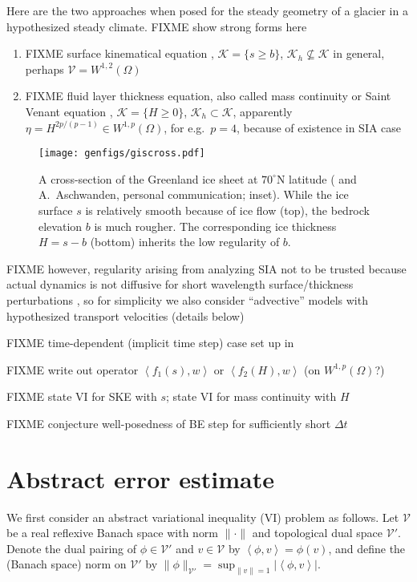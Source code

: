 \documentclass[hidelinks,onefignum,onetabnum,final]{siamart220329}  %
\newcommand{\cK}{\mathcal{K}}
\newcommand{\cV}{\mathcal{V}}
\newcommand{\ip}[2]{\left<#1,#2\right>}
\begin{document}
Here are the two approaches when posed for the steady geometry of a glacier in a hypothesized steady climate.  FIXME show strong forms here

\begin{enumerate}
\item FIXME surface kinematical equation \cite{GreveBlatter2009}, $\cK = \{s\ge b\}$, $\cK_h \nsubseteq \cK$ in general, perhaps $\cV = W^{1,2}(\Omega)$
\item FIXME fluid layer thickness equation, also called mass continuity or Saint Venant equation \cite{JouvetBueler2012}, $\cK = \{H\ge 0\}$, $\cK_h \subset \cK$, apparently $\eta = H^{2p/(p-1)} \in W^{1,p}(\Omega)$, for e.g.~$p=4$, because of existence in SIA case \cite{JouvetBueler2012}
\end{enumerate}

\begin{figure}[ht]
\centering
\texttt{[image: genfigs/giscross.pdf]}
\caption{A cross-section of the Greenland ice sheet at $70^\circ$N latitude (\cite{Morlighemetal2017} and A.~Aschwanden, personal communication; inset).  While the ice surface $s$ is relatively smooth because of ice flow (top), the bedrock elevation $b$ is much rougher.  The corresponding ice thickness $H = s-b$ (bottom) inherits the low regularity of $b$.}
\label{fig:giscross}
\end{figure}

FIXME however, regularity arising from analyzing SIA not to be trusted because actual dynamics is not diffusive for short wavelength surface/thickness perturbations \cite{Pattynetal2008}, so for simplicity we also consider ``advective'' models with hypothesized transport velocities (details below)

FIXME time-dependent (implicit time step) case set up in \cite{Bueler2021conservation}

FIXME write out operator $\ip{f_1(s)}{w}$ or $\ip{f_2(H)}{w}$  (on $W^{1,p}(\Omega)$?)

FIXME state VI for SKE with $s$; state VI for mass continuity with $H$

FIXME conjecture well-posedness of BE step for sufficiently short $\Delta t$


\section{Abstract error estimate} \label{sec:abstractestimate}

We first consider an abstract variational inequality (VI) \cite{KinderlehrerStampacchia1980} problem as follows.  Let $\cV$ be a real reflexive Banach space with norm $\|\cdot\|$ and topological dual space $\cV'$.  Denote the dual pairing of $\phi \in \cV'$ and $v\in\cV$ by $\ip{\phi}{v} = \phi(v)$, and define the (Banach space) norm on $\cV'$ by $\|\phi\|_{\cV'} = \sup_{\|v\|=1} |\!\ip{\phi}{v}\!|$.
\end{document}
